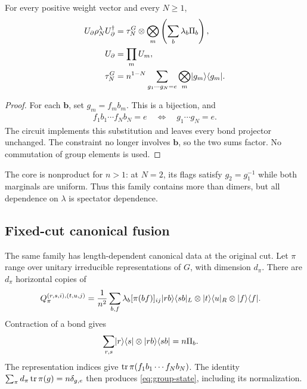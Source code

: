 \begin{proposition}
	\label{prop:group-separation}
	For every positive weight vector and every $N\geq1$,
	\begin{align}
		U_\partial\rho_N^\lambda U_\partial^\dagger
		           & =\tau_N^G\otimes
		\bigotimes_m\left(\sum_b\lambda_b\Pi_b\right), \\
		U_\partial & =\prod_mU_m,                      \\
		\tau_N^G
		           & =n^{1-N}\sum_{g_1\cdots g_N=e}
		\bigotimes_m\lvert g_m\rangle\langle g_m\rvert.
		\label{eq:group-separation}
	\end{align}
\end{proposition}

\begin{proof}
	For each $\boldsymbol b$, set $g_m=f_mb_m$. This is a bijection,
	and
	\begin{align}
		f_1b_1\cdots f_Nb_N=e
		\quad\Longleftrightarrow\quad
		g_1\cdots g_N=e.
	\end{align}
	The circuit implements this substitution and leaves every bond
	projector unchanged. The constraint no longer involves
	$\boldsymbol b$, so the two sums factor. No commutation of group
	elements is used.
\end{proof}

The core is nonproduct for $n>1$: at $N=2$, its flags satisfy
$g_2=g_1^{-1}$ while both marginals are uniform. Thus this family
contains more than dimers, but all dependence on $\lambda$ is
spectator dependence.

\subsection{Fixed-cut canonical fusion}

The same family has length-dependent canonical data at the original
cut. Let $\pi$ range over unitary irreducible representations of $G$,
with dimension $d_\pi$. There are $d_\pi$ horizontal copies of
\begin{align}
	Q_\pi^{(r,s,i),(t,u,j)}
	 & =\frac1{n^2}\sum_{b,f}\lambda_b[\pi(bf)]_{ij}
	\lvert rb\rangle\langle sb\rvert_L\otimes\lvert t\rangle\langle u\rvert_R
	\otimes\lvert f\rangle\langle f\rvert.
	\label{eq:group-tensor}
\end{align}
Contraction of a bond gives
\begin{align}
	\sum_{r,s}\lvert r\rangle\langle s\rvert\otimes\lvert rb\rangle\langle sb\rvert
	 & =n\Pi_b.
\end{align}
The representation indices give
$\operatorname{tr}\pi(f_1b_1\cdots f_Nb_N)$. The identity
$\sum_\pi d_\pi\operatorname{tr}\pi(g)=n\delta_{g,e}$ then produces
\cref{eq:group-state}, including its normalization.

